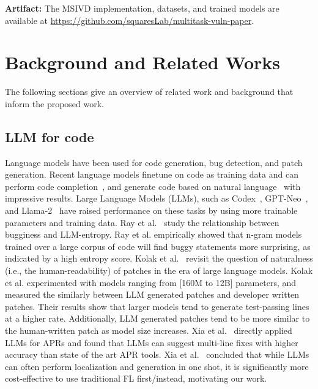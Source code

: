 \documentclass[12pt,openany,oneside,table]{cmuthesis}
\begin{document}
\textbf{Artifact:} The MSIVD implementation, datasets, and trained models are available at \url{https://github.com/squaresLab/multitask-vuln-paper}.




\chapter{Background and Related Works}
\label{ch:background}

The following sections give an overview of related work and background
that inform the proposed work.

\section{LLM for code}
Language models have been used for code generation, bug detection, and patch
generation. Recent language models finetune on code as training data and can
perform code completion~\cite{desai2016program, inCoder}, and generate code
based on natural language~\cite{raychev2014code} with impressive results. Large
Language Models (LLMs), such as Codex~\cite{Codex}, GPT-Neo~\cite{Neox}, and
Llama-2~\cite{Llama} have raised performance on these tasks by using more
trainable parameters and training data. Ray et al.~\cite{NAT} study the
relationship between bugginess and LLM-entropy. Ray et al. empirically showed
that n-gram models trained over a large corpus of code will find buggy
statements more surprising, as indicated by a high entropy score. 
Kolak et
al.~\cite{LLM-PATCH} revisit the question of naturalness (i.e., the
human-readability) of patches in the era of large language models. Kolak et al. experimented with models ranging from [160M to 12B] parameters, and measured the similarly between LLM generated patches and developer written patches. Their
results show that larger models tend to generate test-passing lines at a higher
rate. Additionally, LLM generated patches tend to be more similar to the
human-written patch as model size increases. Xia et al.~\cite{xia2023automated} directly applied LLMs for APRs and found that LLMs can suggest multi-line fixes with higher accuracy than state of the art APR tools. Xia et al.~\cite{xia2023automated} concluded that while LLMs can often perform localization and generation in one shot, it is significantly more cost-effective to use traditional FL first/instead, motivating our work. 
\end{document}
